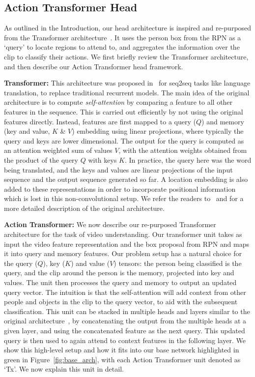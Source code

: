 \documentclass[10pt,twocolumn,letterpaper]{article}
\newcommand{\Tx}[0]{Action Transformer}
\begin{document}
\subsection{\Tx{} Head}\label{sec:app:tx_head}

As outlined  in the Introduction, our head architecture 
is inspired and
re-purposed from the Transformer
architecture~\cite{vaswani2017attention}. It uses the person box from the RPN as a
`query' to locate regions to attend to, and aggregates the information
over the clip to classify their actions.  We first 
briefly review  the Transformer architecture, and then describe our
\Tx{} head framework.

{\noindent \bf Transformer:}  This architecture was
proposed in~\cite{vaswani2017attention} for
seq2seq tasks like language translation, to replace traditional
recurrent models. The main idea of the original architecture is to compute
{\em self-attention} by comparing a feature to all other features in the sequence.
This is carried out efficiently by not using the original features directly. Instead, features
are first mapped to a
query ($Q$) and memory (key and value, $K$ \& $V$) embedding using
linear projections, 
where typically the query and keys are lower dimensional. 
The output for the query
is computed as an attention weighted sum of values $V$, with  the attention weights obtained from
the product of the query $Q$ with 
keys 
$K$. 
In practice, the query here was the word being translated, and the keys and
values are linear projections of the input sequence and the output
sequence generated so far. A location embedding is also added to these
representations in order to incorporate positional information which
is lost in this non-convolutional setup. We refer the readers
to~\cite{vaswani2017attention} and \cite{parmar2018image} for a more
detailed description of the original architecture.

{\noindent \bf \Tx{}:} We now describe our re-purposed Transformer
architecture for the task of video understanding.  Our transformer
unit takes as input the video feature representation and the box
proposal from RPN and maps it into query and memory features.
Our problem setup has a natural
choice for the 
 query ($Q$),
key ($K$) and value ($V$) tensors: the person being classified is the query,
and the
clip around the person is the memory, projected into key and values.
The unit then processes the query and
memory to output an updated query vector. 
The intuition is that the self-attention will add context from other people and objects in the clip to
the query vector, to aid with the subsequent classification.
This unit can be stacked in
multiple heads and layers similar to the original
architecture~\cite{vaswani2017attention}, by concatenating the output
from the multiple heads at a given layer, and using the concatenated
feature as the next query. This updated query is then used to again
attend to context features in the following layer. We show this high-level setup and how it fits into our base network highlighted in green in
Figure~\ref{fig:base_arch}, with each \Tx{} unit denoted as `Tx'. We now explain this unit in detail.
\end{document}
